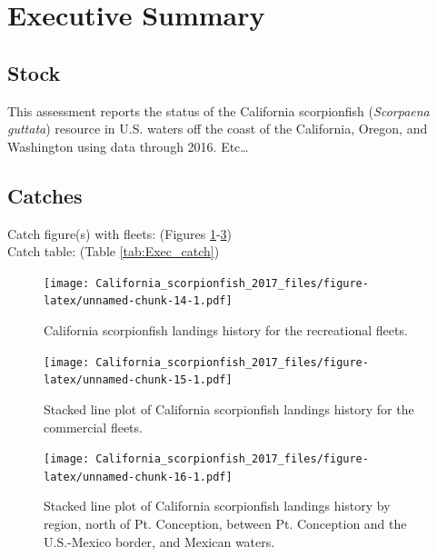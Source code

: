 \documentclass[12pt,]{article}
\begin{document}
{
\setcounter{tocdepth}{4}
\tableofcontents
}
\setlength{\parskip}{5mm plus1mm minus1mm} \pagebreak

 \setcounter{page}{1}
\renewcommand{\thefigure}{\alph{figure}}
\renewcommand{\thetable}{\alph{table}}

\section*{Executive Summary}\label{executive-summary}

\subsection*{Stock}\label{stock}

This assessment reports the status of the California scorpionfish
(\emph{Scorpaena guttata}) resource in U.S. waters off the coast of the
California, Oregon, and Washington using data through 2016. Etc\ldots{}

\subsection*{Catches}\label{catches}

Catch figure(s) with fleets: (Figures
\ref{fig:Exec_catch1}-\ref{fig:Exec_catch3})\\
Catch table: (Table \ref{tab:Exec_catch})

\FloatBarrier

\begin{figure}[htbp]
\centering
\texttt{[image: California\_scorpionfish\_2017\_files/figure-latex/unnamed-chunk-14-1.pdf]}
\caption{California scorpionfish landings history for the recreational
fleets. \label{fig:Exec_catch1}}
\end{figure}

\begin{figure}[htbp]
\centering
\texttt{[image: California\_scorpionfish\_2017\_files/figure-latex/unnamed-chunk-15-1.pdf]}
\caption{Stacked line plot of California scorpionfish landings history
for the commercial fleets. \label{fig:Exec_catch2}}
\end{figure}

\begin{figure}[htbp]
\centering
\texttt{[image: California\_scorpionfish\_2017\_files/figure-latex/unnamed-chunk-16-1.pdf]}
\caption{Stacked line plot of California scorpionfish landings history
by region, north of Pt. Conception, between Pt. Conception and the
U.S.-Mexico border, and Mexican waters. \label{fig:Exec_catch3}}
\end{figure}
\end{document}
